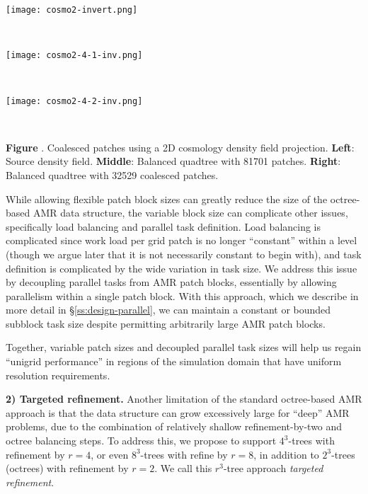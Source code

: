 \documentclass[11pt,letterpaper]{article}
\newcounter{figctr}
\newcommand{\FIGURE}[3]{
\noindent
\parbox{\textwidth}{
\begin{center}
#3
\end{center}%
\ \nolinebreak%
\refstepcounter{figctr}%
\begin{center}%
\begin{minipage}{7.0in}
\textbf{Figure \thefigctr}. #1
\end{minipage}
\end{center}
\label{#2}
}}
\begin{document}
\FIGURE{ Coalesced patches using a 2D cosmology
   density field projection.  \textbf{Left}: Source density field.
   \textbf{Middle}: Balanced quadtree with 81701 patches.
   \textbf{Right}: Balanced quadtree with 32529 coalesced patches.
} {f:cosmo}{
\begin{minipage}{7.0in}
\begin{minipage}{2.2in}
\texttt{[image: cosmo2-invert.png]}
\end{minipage} \ 
\begin{minipage}{2.2in}
\texttt{[image: cosmo2-4-1-inv.png]}
\end{minipage} \ 
\begin{minipage}{2.2in}
\texttt{[image: cosmo2-4-2-inv.png]}
\end{minipage}
\end{minipage}
}

While allowing flexible patch block sizes can greatly reduce the size
of the octree-based AMR data structure, the variable block size can
complicate other issues, specifically load balancing and parallel task
definition.  Load balancing is complicated since work load per grid
patch is no longer ``constant'' within a level (though we argue later
that it is not necessarily constant to begin with), and task
definition is complicated by the wide variation in task size.  We
address this issue by decoupling parallel tasks from AMR patch blocks,
essentially by allowing parallelism within a single patch block.  With
this approach, which we describe in more detail in
\S\ref{ss:design-parallel}, we can maintain a constant or bounded
subblock task size despite permitting arbitrarily large AMR patch
blocks.  

Together, variable patch sizes and decoupled parallel task sizes will
help us regain ``unigrid performance'' in regions of the simulation
domain that have uniform resolution requirements.


\textbf{2) Targeted refinement.}  Another limitation of the standard
octree-based AMR approach is that the data structure can grow
excessively large for ``deep'' AMR problems, due to the combination of
relatively shallow refinement-by-two and octree balancing steps.  To
address this, we propose to support $4^3$-trees with refinement by
$r=4$, or even $8^3$-trees with refine by $r=8$, in addition to
$2^3$-trees (octrees) with refinement by $r=2$.  We call this
$r^3$-tree approach \textit{targeted refinement}.
\end{document}
